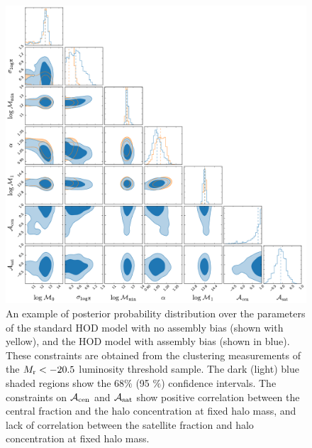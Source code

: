 \documentclass[12pt, preprint]{aastex}
\newcommand{\acen}{\mathcal{A}_{\rm cen}}
\newcommand{\asat}{\mathcal{A}_{\rm sat}}
\begin{document}
\begin{figure}[p]~\\
\begin{center}
\includegraphics[width=\textwidth]{post20_5combined.pdf}
\caption{An example of posterior probability distribution over the parameters of the standard HOD model with no assembly bias (shown with yellow), and the HOD model with assembly bias (shown in blue). These constraints are obtained from the clustering measurements of the $M_{\rm r} < -20.5$ luminosity threshold sample. The dark (light) blue shaded regions show the 68$\%$ (95 $\%$) confidence intervals. The constraints on $\acen$ and $\asat$ show positive correlation between the central fraction and the halo concentration at fixed halo mass, and lack of correlation between the satellite fraction and halo concentration at fixed halo mass.}
\label{fig:posterior}
\end{center}
\end{figure}



\end{document}
